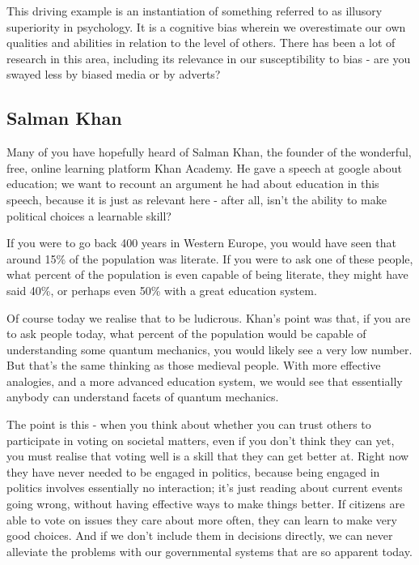 \documentclass[twoside]{article}
\theoremstyle{definition}
\begin{document}
This driving example is an instantiation of something referred to as illusory superiority in psychology. It is a cognitive bias wherein we overestimate our own qualities and abilities in relation to the level of others. There has been a lot of research in this area, including its relevance in our susceptibility to bias - are you swayed less by biased media or by adverts?

\subsection{Salman Khan}

Many of you have hopefully heard of Salman Khan, the founder of the wonderful, free, online learning platform Khan Academy. He gave a speech at google about education; we want to recount an argument he had about education in this speech, because it is just as relevant here - after all, isn’t the ability to make political choices a learnable skill?

If you were to go back 400 years in Western Europe, you would have seen that around 15\% of the population was literate. If you were to ask one of these people, what percent of the population is even capable of being literate, they might have said 40\%, or perhaps even 50\% with a great education system. 

Of course today we realise that to be ludicrous. Khan’s point was that, if you are to ask people today, what percent of the population would be capable of understanding some quantum mechanics, you would likely see a very low number. But that’s the same thinking as those medieval people. With more effective analogies, and a more advanced education system, we would see that essentially anybody can understand facets of quantum mechanics.

The point is this - when you think about whether you can trust others to participate in voting on societal matters, even if you don’t think they can yet, you must realise that voting well is a skill that they can get better at. Right now they have never needed to be engaged in politics, because being engaged in politics involves essentially no interaction; it’s just reading about current events going wrong, without having effective ways to make things better. If citizens are able to vote on issues they care about more often, they can learn to make very good choices. And if we don’t include them in decisions directly, we can never alleviate the problems with our governmental systems that are so apparent today.
\end{document}
